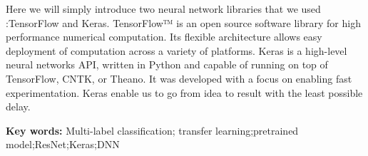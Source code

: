 {Here we will simply introduce two neural network libraries that we used :TensorFlow and Keras.
TensorFlow™ is an open source software library for high performance numerical computation. 
Its flexible architecture allows easy deployment of computation across a variety of platforms.
Keras is a high-level neural networks API, written in Python 
and capable of running on top of TensorFlow, CNTK, or Theano. It was developed with a focus on enabling 
fast experimentation. Keras enable us to go from idea to result with the least possible delay.

\par}

\vspace{-0.2\baselineskip}
\noindent\textbf{Key words: } Multi-label classification; transfer learning;pretrained model;ResNet;Keras;DNN 

\clearpage